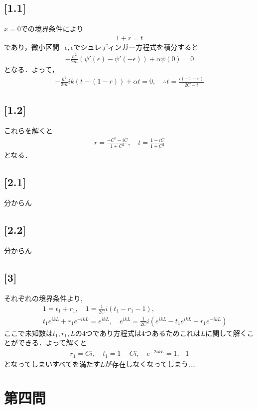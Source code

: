 \documentclass[12pt,dvipdfmx]{jsarticle}
\begin{document}
\subsection*{\large{[1.1]}}
$x=0$での境界条件により
\begin{eqnarray}
  1+r=t
\end{eqnarray}
であり，微小区間$-\epsilon,\epsilon$でシュレディンガー方程式を積分すると
\begin{eqnarray}
  -\frac{\hbar^2}{2m}\left( \psi'(\epsilon)-\psi'(-\epsilon) \right) + \alpha \psi(0) = 0
\end{eqnarray}
となる．よって，
\begin{eqnarray}
  -\frac{\hbar^2}{2m}ik\left( t-(1-r) \right) + \alpha t = 0, \quad\therefore t = \frac{i(-1+r)}{2C-i}
\end{eqnarray}
\subsection*{\large{[1.2]}}
これらを解くと
\begin{eqnarray}
  r = \frac{-C^2-iC}{1+C^2}, \quad t =\frac{1-iC}{1+C^2}
\end{eqnarray}
となる．
\subsection*{\large{[2.1]}}
分からん
\subsection*{\large{[2.2]}}
分からん
\subsection*{\large{[3]}}
それぞれの境界条件より,
\begin{eqnarray}
  &&1= t_1 +r_1, \quad 1 = \frac{1}{2C}i( t_1-r_1-1 ),\\
  &&t_1e^{ikL} + r_1 e^{-ikL} = e^{ikL}, \quad e^{ikL} = \frac{1}{2C}i( e^{ikL}- t_1e^{ikL} + r_1 e^{-ikL}  )
\end{eqnarray}
ここで未知数は$t_1,r_1,L$の4つであり方程式は$4$つあるためこれは$L$に関して解くことができる．よって解くと
\begin{eqnarray}
  r_1 = Ci, \quad t_1 = 1- Ci, \quad e^{-2ikL} = 1,-1
\end{eqnarray}
となってしまいすべてを満たす$L$が存在しなくなってしまう....
\newpage
\section*{\Large{第四問}}
\end{document}
